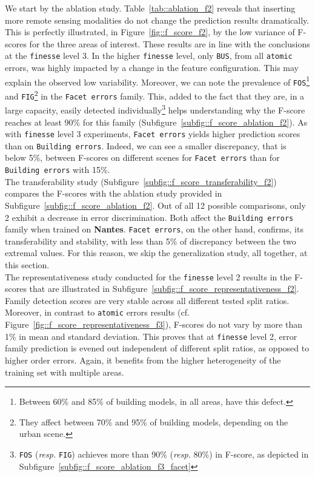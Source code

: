         We start by the ablation study.
        Table~\ref{tab::ablation_f2} reveals that inserting more remote sensing modalities do not change the prediction results dramatically.
        This is perfectly illustrated, in Figure~\ref{fig::f_score_f2}, by the low variance of F-scores for the three areas of interest.
        These results are in line with the conclusions at the \texttt{finesse} level 3.
        In the higher \texttt{finesse} level, only \texttt{BUS}, from all \texttt{atomic} errors, was highly impacted by a change in the feature configuration.
        This may explain the observed low variability.
        Moreover, we can note the prevalence of \texttt{FOS}\footnote{
            Between 60\% and 85\% of building models, in all areas, have this defect.
        } and \texttt{FIG}\footnote{
            They affect between 70\% and 95\% of building models, depending on the urban scene.
        } in the \texttt{Facet errors} family.
        This, added to the fact that they are, in a large capacity, easily detected individually\footnote{
            \texttt{FOS} (\textit{resp.} \texttt{FIG}) achieves more than 90\% (\textit{resp.} 80\%) in F-score, as depicted in Subfigure~\ref{subfig::f_score_ablation_f3_facet}
        } helps understanding why the F-score reaches at least 90\% for this family (Subfigure~\ref{subfig::f_score_ablation_f2}).
        As with \texttt{finesse} level 3 experiments, \texttt{Facet errors} yields higher prediction scores than on \texttt{Building errors}.
        Indeed, we can see a smaller discrepancy, that is below 5\%, between F-scores on different scenes for \texttt{Facet errors} than for \texttt{Building errors} with 15\%.\\

        The transferability study (Subfigure~\ref{subfig::f_score_transferability_f2}) compares the F-scores with the ablation study provided in Subfigure~\ref{subfig::f_score_ablation_f2}.
        Out of all 12 possible comparisons, only 2 exhibit a decrease in error discrimination.
        Both affect the \texttt{Building errors} family when trained on \textbf{Nantes}.
        \texttt{Facet errors}, on the other hand, confirms, its transferability and stability, with less than 5\% of discrepancy between the two extremal values.
        For this reason, we skip the generalization study, all together, at this section.\\

        The representativeness study conducted for the \texttt{finesse} level 2 results in the F-scores that are illustrated in Subfigure~\ref{subfig::f_score_representativeness_f2}.
        Family detection scores are very stable across all different tested split ratios.
        Moreover, in contrast to \texttt{atomic} errors results (cf. Figure~\ref{fig::f_score_representativeness_f3}), F-scores do not vary by more than 1\% in mean and standard deviation.
        This proves that at \texttt{finesse} level 2, error family prediction is evened out independent of different split ratios, as opposed to higher order errors.
        Again, it benefits from the higher heterogeneity of the training set with multiple areas.
    
